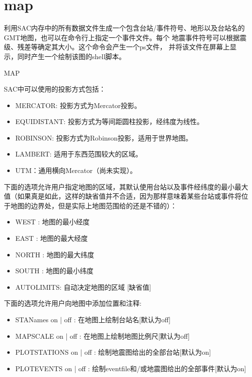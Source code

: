 \section{map}
\label{cmd:map}

利用SAC内存中的所有数据文件生成一个包含台站/事件符号、地形以及台站名的
GMT地图，也可以在命令行上指定一个事件文件。每个
地震事件符号可以根据震级、残差等确定其大小。这个命令会产生一个ps文件，
并将该文件在屏幕上显示，同时产生一个绘制该图的shell脚本。

MAP

SAC中可以使用的投影方式包括：
\begin{itemize}
\item MERCATOR:	投影方式为Mercator投影。
\item EQUIDISTANT: 投影方式为等间距圆柱投影，经纬度为线性。
\item ROBINSON: 投影方式为Robinson投影，适用于世界地图。
\item LAMBERT: 适用于东西范围较大的区域。
\item UTM：通用横向Mercator（尚未实现）。
\end{itemize}

下面的选项允许用户指定地图的区域，其默认使用台站以及事件经纬度的最小最大值（如果真是如此，这样的缺省值并不合适，因为那样意味着某些台站或事件将位于地图的边界处，但是实际上地图范围给的还是不错的）：
\begin{itemize}
\item WEST :  地图的最小经度 
\item EAST : 地图的最大经度 
\item NORTH : 地图的最大纬度 
\item SOUTH : 地图的最小纬度 
\item AUTOLIMITS:  自动决定地图的区域 [缺省值] 
\end{itemize}
  
下面的选项允许用户向地图中添加位置和注释:
\begin{itemize}
\item STANames on | off :  在地图上绘制台站名[默认为off]
\item MAPSCALE on | off :  在地图上绘制地图比例尺[默认为off]
\item PLOTSTATIONS on | off : 绘制地震图给出的全部台站[默认为on]
\item PLOTEVENTS on | off : 绘制eventfile和/或地震图给出的全部事件[默认为on]
\end{itemize}

